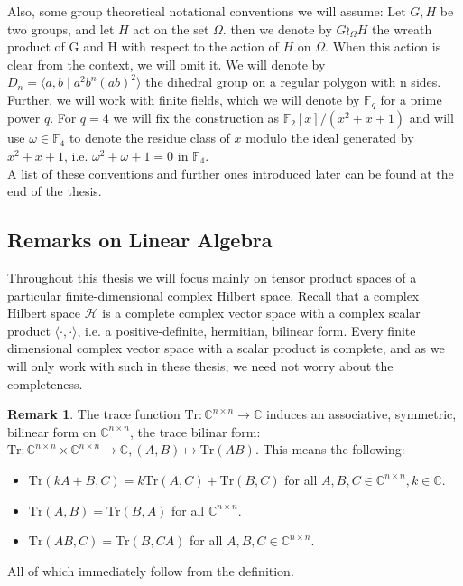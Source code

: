 \documentclass[12pt,a4paper,BCOR15mm,twoside,DIV12]{article}
\def\F{\mathbb{F}}
\def\C{\mathbb{C}}
\def\Tr{\text{Tr}}
\theoremstyle{definition}
\newtheorem{rem}[Satz]{Remark}
\begin{document}
Also, some group theoretical notational conventions we will assume:
Let $G, H$ be two groups, and let $H$ act on the set $\Omega$. then we denote by $ G \wr_\Omega H$ the wreath product of G and H with respect to the action of $H$ on $\Omega$. When this action is clear from the context, we will omit it. 
We will denote by $D_n = \langle a, b \mid a^2 b^n (ab)^2 \rangle$ the dihedral group on a regular polygon with n sides. \\

Further, we will work with finite fields, which we will denote by $\F_{q}$ for a prime power $q$. For $q = 4$ we will fix the construction as $\F_2[x]/(x^2 + x + 1)$ and will use $ \omega \in \F_4$ to denote the residue class of $x$ modulo the ideal generated by $x^2 + x + 1$, i.e. 
$\omega^2 + \omega + 1 = 0$ in $\F_4$. \\

A list of these conventions and further ones introduced later can be found at the end of the thesis. 

\subsection{ Remarks on Linear Algebra}
Throughout this thesis we will focus mainly on tensor product spaces of a particular finite-dimensional complex Hilbert space. Recall that a complex Hilbert space $\mathcal{H}$ is a complete complex vector space with a complex scalar product $\langle \cdot , \cdot \rangle$, i.e. a positive-definite, hermitian, bilinear form. Every finite dimensional complex vector space with a scalar product is complete, and as we will only work with such in these thesis, we need not worry about the completeness.


\begin{rem}
The trace function $\Tr : \C^{n \times n} \rightarrow \C$ induces an associative, symmetric, bilinear form on $\C^{n \times n}$, the trace bilinar form: $ \Tr: \C^{n \times n} \times \C^{n \times n} \rightarrow \C, (A,B) \mapsto \Tr(AB)$. This means the following:
\begin{itemize}
\item $\Tr(k A + B, C) = k \Tr(A,C) + \Tr(B,C)$ for all $A,B,C \in \C^{n \times n}, k \in \C$.
\item $\Tr(A,B) = \Tr(B,A)$ for all $\C^{n \times n}$.
\item $\Tr(AB,C) = \Tr(B,CA)$ for all $A,B,C \in \C^{n \times n}$.
\end{itemize}

All of which immediately follow from the definition.
\end{rem}
\end{document}
